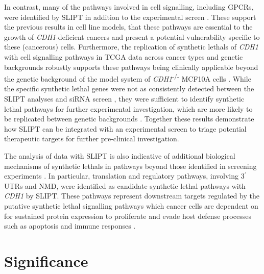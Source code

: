In contrast, many of the pathways involved in cell signalling, including \glspl{GPCR}, were identified by \gls{SLIPT} in addition to the experimental screen \citep{Telford2015}. These support the previous results in cell line models, that these pathways are \gls{essential} to the growth of \textit{CDH1}-deficient cancers and present a potential vulnerability specific to these (cancerous) cells. Furthermore, the replication of \glspl{synthetic lethal} of \textit{CDH1} with cell signalling pathways in \gls{TCGA} data across cancer types and genetic backgrounds robustly supports these pathways being clinically applicable beyond the genetic background of the model system of \textit{CDH1}\textsuperscript{-/-} MCF10A cells \citep{Chen2014}. While the specific \gls{synthetic lethal} genes were not as consistently detected between the \gls{SLIPT} analyses and \gls{siRNA} screen \citep{Telford2015}, they were sufficient to identify \gls{synthetic lethal} pathways for further experimental investigation, which are more likely to be replicated between genetic backgrounds \citep{Dixon2008}. Together these results demonstrate how \gls{SLIPT} can be integrated with an experimental screen to triage potential therapeutic targets  for further pre-clinical investigation.

The analysis of  data with \gls{SLIPT} is also indicative of additional biological mechanisms of \glspl{synthetic lethal} in pathways beyond those identified in screening experiments \citep{Telford2015}. In particular, translation and regulatory pathways, involving 3$^\prime$ \glspl{UTR} and \gls{NMD}, were identified as candidate \gls{synthetic lethal} pathways with \textit{CDH1} by \gls{SLIPT}. These pathways represent downstream targets regulated by the putative \gls{synthetic lethal} signalling pathways which cancer cells are dependent on for sustained protein expression to proliferate and evade host defense processes such as apoptosis and immune responses \citep{Gao2015} . 



\section{Significance}
\label{chapt6:significance}

